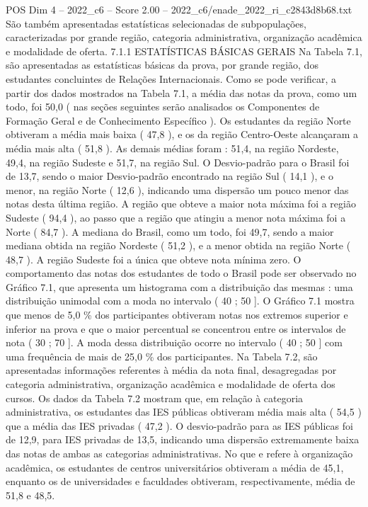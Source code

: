 \begin{textsample}{POS Dim 4 – 2022\_c6 – Score 2.00 – 2022\_c6/enade\_2022\_ri\_c2843d8b68.txt}
São também apresentadas estatísticas selecionadas de subpopulações, caracterizadas por grande região, categoria administrativa, organização acadêmica e modalidade de oferta. 7.1.1 ESTATÍSTICAS BÁSICAS GERAIS Na Tabela 7.1, são apresentadas as estatísticas básicas da prova, por grande região, dos estudantes concluintes de Relações Internacionais.
Como se pode verificar, a partir dos dados mostrados na Tabela 7.1, a média das notas da prova, como um todo, foi 50,0 ( nas seções seguintes serão analisados os Componentes de Formação Geral e de Conhecimento Específico ).
Os estudantes da região Norte obtiveram a média mais baixa ( 47,8 ), e os da região Centro-Oeste alcançaram a média mais alta ( 51,8 ).
As demais médias foram : 51,4, na região Nordeste, 49,4, na região Sudeste e 51,7, na região Sul.
O Desvio-padrão para o Brasil foi de 13,7, sendo o maior Desvio-padrão encontrado na região Sul ( 14,1 ), e o menor, na região Norte ( 12,6 ), indicando uma dispersão um pouco menor das notas desta última região.
A região que obteve a maior nota máxima foi a região Sudeste ( 94,4 ), ao passo que a região que atingiu a menor nota máxima foi a Norte ( 84,7 ).
A mediana do Brasil, como um todo, foi 49,7, sendo a maior mediana obtida na região Nordeste ( 51,2 ), e a menor obtida na região Norte ( 48,7 ).
A região Sudeste foi a única que obteve nota mínima zero.
O comportamento das notas dos estudantes de todo o Brasil pode ser observado no Gráfico 7.1, que apresenta um histograma com a distribuição das mesmas : uma distribuição unimodal com a moda no intervalo ( 40 ; 50 ].
O Gráfico 7.1 mostra que menos de 5,0 \% dos participantes obtiveram notas nos extremos superior e inferior na prova e que o maior percentual se concentrou entre os intervalos de nota ( 30 ; 70 ].
A moda dessa distribuição ocorre no intervalo ( 40 ; 50 ] com uma frequência de mais de 25,0 \% dos participantes.
Na Tabela 7.2, são apresentadas informações referentes à média da nota final, desagregadas por categoria administrativa, organização acadêmica e modalidade de oferta dos cursos.
Os dados da Tabela 7.2 mostram que, em relação à categoria administrativa, os estudantes das IES públicas obtiveram média mais alta ( 54,5 ) que a média das IES privadas ( 47,2 ).
O desvio-padrão para as IES públicas foi de 12,9, para IES privadas de 13,5, indicando uma dispersão extremamente baixa das notas de ambas as categorias administrativas.
No que e refere à organização acadêmica, os estudantes de centros universitários obtiveram a média de 45,1, enquanto os de universidades e faculdades obtiveram, respectivamente, média de 51,8 e 48,5.

\end{textsample}
